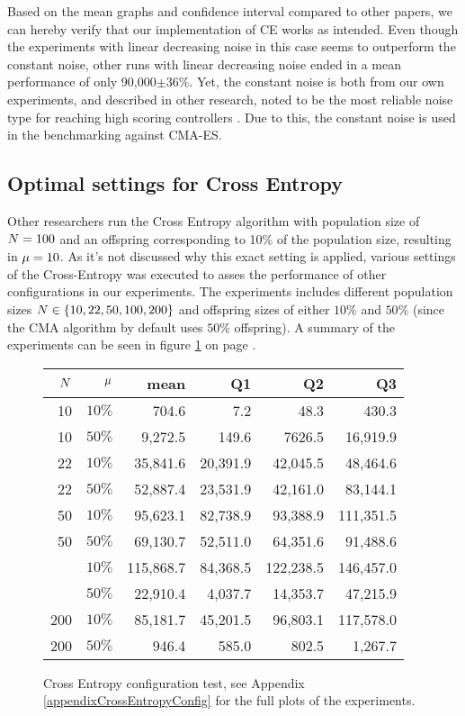 Based on the mean graphs and confidence interval compared to other papers, we can
hereby verify that our implementation of CE works as intended. Even though the
experiments with linear decreasing noise in this case seems to outperform
the constant noise, other runs with linear decreasing noise ended in a mean 
performance of only 90,000$\pm36\%$. Yet, the constant noise is both from our
own experiments, and described in other research, noted to be the most reliable
noise type for reaching high scoring controllers \citep{scherrer2009}. 
Due to this, the constant noise is used in the 
benchmarking against CMA-ES.\\

\subsection{Optimal settings 
for Cross Entropy \label{optimalsettingsce}}

Other researchers run the Cross Entropy algorithm with population size of
$N = 100$ and an offspring corresponding to 10\% of 
the population size, resulting in $\mu = 10$. As it's not 
discussed why this exact setting is applied, various settings of the 
Cross-Entropy was executed to asses the performance of other configurations
in our experiments.
The experiments includes different population sizes 
$N \in \{10, 22, 50, 100, 200\}$ and offspring 
sizes of either $10\%$ and $50\%$ (since the CMA algorithm by default
uses $50 \%$ offspring). 
A summary of the experiments can be seen in figure \ref{CEConfigTest}
on page \pageref{CEConfigTest}.

\begin{figure}[H]
\centering
\begin{tabular}{r r | r r r r}
$N$ & $\mu$ & mean & Q1 & Q2 & Q3\\
\hline
10 & $10\%$  & 704.6      & 7.2       & 48.3         & 430.3\\
10 & $50\%$  & 9,272.5    & 149.6     & 7626.5       & 16,919.9\\
22 & $10\%$  & 35,841.6   & 20,391.9  & 42,045.5     & 48,464.6\\
22 & $50\%$  & 52,887.4   & 23,531.9  & 42,161.0     & 83,144.1\\
50 & $10\%$  & 95,623.1   & 82,738.9  & 93,388.9     & 111,351.5\\
50 & $50\%$  & 69,130.7   & 52,511.0  & 64,351.6     & 91,488.6\\
\hdashline
100 & $10\%$ & 115,868.7  & 84,368.5  & 122,238.5    & 146,457.0\\
\hdashline
100 & $50\%$ & 22,910.4   & 4,037.7   & 14,353.7     & 47,215.9\\
200 & $10\%$ & 85,181.7   & 45,201.5  & 96,803.1     & 117,578.0\\
200 & $50\%$ & 946.4      & 585.0     & 802.5        & 1,267.7
\end{tabular}
\caption{Cross Entropy configuration test, 
see Appendix \ref{appendixCrossEntropyConfig} for the full plots 
of the experiments.  \label{CEConfigTest}}
\end{figure}

